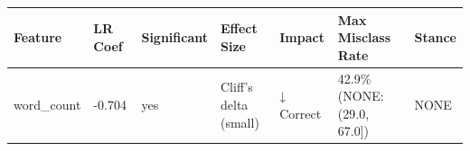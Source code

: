\begin{tabular}{lllllll}
\toprule
Feature & LR Coef & Significant & Effect Size & Impact & Max Misclass Rate & Stance \\
\midrule
word\_count & -0.704 & yes & Cliff's delta (small) & ↓ Correct & 42.9\% (NONE: (29.0, 67.0]) & NONE \\
\bottomrule
\end{tabular}
